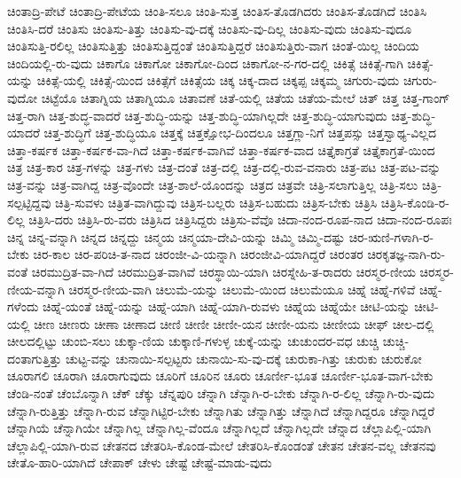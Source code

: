 {ಚಿಂತಾದ್ರಿ-ಪೇಟೆ
ಚಿಂತಾದ್ರಿ-ಪೇಟೆಯ
ಚಿಂತಿ-ಸಲೂ
ಚಿಂತಿ-ಸುತ್ತ
ಚಿಂತಿಸ-ತೊಡಗಿದರು
ಚಿಂತಿಸ-ತೊಡಗಿದೆ
ಚಿಂತಿಸಿ
ಚಿಂತಿಸಿ-ದರೆ
ಚಿಂತಿಸು
ಚಿಂತಿಸು-ತಿತ್ತು
ಚಿಂತಿಸು-ವು-ದಕ್ಕೆ
ಚಿಂತಿಸು-ವು-ದಿಲ್ಲ
ಚಿಂತಿಸು-ವುದು
ಚಿಂತಿಸು-ವುದೂ
ಚಿಂತಿಸುತ್ತಿ-ರಲಿಲ್ಲ
ಚಿಂತಿಸುತ್ತಿತ್ತು
ಚಿಂತಿಸುತ್ತಿದ್ದಂತೆ
ಚಿಂತಿಸುತ್ತಿದ್ದರೆ
ಚಿಂತಿಸುತ್ತಿರು-ವಾಗ
ಚಿಂತೆ-ಯಿಲ್ಲ
ಚಿಂದಿಯ
ಚಿಂದಿಯಲ್ಲಿ-ರು-ವುದು
ಚಿಕಾಗೊ
ಚಿಕಾಗೋ
ಚಿಕಾಗೋ-ದಿಂದ
ಚಿಕಾಗೋ-ನ-ಗರ-ದಲ್ಲಿ
ಚಿಕಿತ್ಸೆ
ಚಿಕಿತ್ಸೆ-ಗಾಗಿ
ಚಿಕಿತ್ಸೆ-ಯನ್ನು
ಚಿಕಿತ್ಸೆ-ಯಲ್ಲಿ
ಚಿಕಿತ್ಸೆ-ಯಿಂದ
ಚಿಕಿತ್ಸೆಗೆ
ಚಿಕಿತ್ಸೆಯ
ಚಿಕ್ಕ
ಚಿಕ್ಕ-ದಾದ
ಚಿಕ್ಕಪ್ಪ
ಚಿಕ್ಕಮ್ಮ
ಚಿಗುರು-ವುದು
ಚಿಗುರು-ವುದೋ
ಚಿಟ್ಟೆಯೊ
ಚಿತಾಗ್ನಿಯ
ಚಿತಾಗ್ನಿಯೂ
ಚಿತಾವಣೆ
ಚಿತೆ-ಯಲ್ಲಿ
ಚಿತೆಯ
ಚಿತೆಯ-ಮೇಲೆ
ಚಿತ್
ಚಿತ್ತ
ಚಿತ್ತ-ಗಾಂಗ್
ಚಿತ್ತ-ರಾಗಿ
ಚಿತ್ತ-ಶುದ್ಧ-ವಾದರೆ
ಚಿತ್ತ-ಶುದ್ಧಿ-ಯನ್ನು
ಚಿತ್ತ-ಶುದ್ಧಿ-ಯಾಗಿಲ್ಲದೇ
ಚಿತ್ತ-ಶುದ್ಧಿ-ಯಾಗುವುದು
ಚಿತ್ತ-ಶುದ್ಧಿ-ಯಾದರೆ
ಚಿತ್ತ-ಶುದ್ಧಿಗೆ
ಚಿತ್ತ-ಶುದ್ಧಿಯೂ
ಚಿತ್ತಕ್ಕೆ
ಚಿತ್ತಕ್ಷೋಭ-ದಿಂದಲೂ
ಚಿತ್ತಗ್ಲಾ-ನಿಗೆ
ಚಿತ್ತಪಸ್ಸು
ಚಿತ್ತಸ್ವಾಥ್ಯ-ವಿಲ್ಲದ
ಚಿತ್ತಾ-ಕರ್ಷಕ
ಚಿತ್ತಾ-ಕರ್ಷಕ-ವಾ-ಗಿದೆ
ಚಿತ್ತಾ-ಕರ್ಷಕ-ವಾಗಿವೆ
ಚಿತ್ತಾ-ಕರ್ಷಕ-ವಾದ
ಚಿತ್ತೈಕಾಗ್ರತೆ
ಚಿತ್ತೈಕಾಗ್ರತೆ-ಯಿಂದ
ಚಿತ್ರ
ಚಿತ್ರ-ಕಾರ
ಚಿತ್ರ-ಗಳನ್ನು
ಚಿತ್ರ-ಗಳು
ಚಿತ್ರ-ದಂತೆ
ಚಿತ್ರ-ದಲ್ಲಿ
ಚಿತ್ರ-ದಲ್ಲಿ-ರುವ-ವನಾರು
ಚಿತ್ರ-ಪಟ
ಚಿತ್ರ-ಪಟ-ವನ್ನು
ಚಿತ್ರ-ವನ್ನು
ಚಿತ್ರ-ವಾಗಿದ್ದ
ಚಿತ್ರ-ವೊಂದೇ
ಚಿತ್ರ-ಶಾಲೆ-ಯೊಂದನ್ನು
ಚಿತ್ರದ
ಚಿತ್ರವೇ
ಚಿತ್ರಿ-ಸಲಾಗುತ್ತಿಲ್ಲ
ಚಿತ್ರಿ-ಸಲು
ಚಿತ್ರಿ-ಸಲ್ಪಟ್ಟಿದ್ದವು
ಚಿತ್ರಿ-ಸುವಳು
ಚಿತ್ರಿತ-ವಾಗಿದ್ದುವು
ಚಿತ್ರಿಸ-ಬಲ್ಲರು
ಚಿತ್ರಿಸ-ಬಹುದು
ಚಿತ್ರಿಸ-ಬೇಕು
ಚಿತ್ರಿಸಿ
ಚಿತ್ರಿಸಿ-ಕೊಂಡಿ-ರ-ಲಿಲ್ಲ
ಚಿತ್ರಿಸಿ-ದರು
ಚಿತ್ರಿಸಿ-ರು-ವರು
ಚಿತ್ರಿಸಿದ
ಚಿತ್ರಿಸಿದ್ದರು
ಚಿತ್ರಿಸು-ವೆವೊ
ಚಿದಾ-ನಂದ-ರೂಪ-ನಾದ
ಚಿದಾ-ನಂದ-ರೂಪಃ
ಚಿನ್ನ
ಚಿನ್ನ-ವನ್ನಾಗಿ
ಚಿನ್ನದ
ಚಿನ್ನದ್ದು
ಚಿನ್ಮಯ
ಚಿನ್ಮಯಾ-ದೇವಿ-ಯನ್ನು
ಚಿಮ್ಮಿ
ಚಿಮ್ಮಿ-ದಷ್ಟು
ಚಿರ-ಋಣಿ-ಗಳಾಗಿ-ರ-ಬೇಕು
ಚಿರ-ಕಾಲ
ಚಿರ-ಪರಿಚಿ-ತ-ನಾದ
ಚಿರಂಜೀ-ವಿ-ಯನ್ನಾಗಿ
ಚಿರಂಜೀವಿ-ಯಾಗಿದ್ದರೆ
ಚಿರಂತರ
ಚಿರಕೃತಜ್ಞ-ನಾಗಿ-ರು-ವಂತೆ
ಚಿರಮುದ್ರಿತ-ವಾ-ಗಿದೆ
ಚಿರಮುದ್ರಿತ-ವಾಗಿವೆ
ಚಿರಸ್ಥಾಯಿ-ಯಾಗಿ
ಚಿರಸ್ನೇಹಿ-ತ-ರಾದರು
ಚಿರಸ್ಮರ-ಣೀಯ
ಚಿರಸ್ಮರ-ಣೀಯ-ವನ್ನಾಗಿ
ಚಿರಸ್ಮರ-ಣೀಯ-ವಾಗಿ
ಚಿಲುಮೆ-ಯನ್ನು
ಚಿಲುಮೆ-ಯಿಂದ
ಚಿಲುಮೆಯೂ
ಚಿಹ್ನೆ
ಚಿಹ್ನೆ-ಗಳಿವೆ
ಚಿಹ್ನೆ-ಗಳೆಂದು
ಚಿಹ್ನೆ-ಯಂತೆ
ಚಿಹ್ನೆ-ಯನ್ನು
ಚಿಹ್ನೆ-ಯಾಗಿ
ಚಿಹ್ನೆ-ಯಾಗಿ-ರುವಳು
ಚಿಹ್ನೆಯ
ಚಿಹ್ನೆಯೇ
ಚೀಟಿ-ಯನ್ನು
ಚೀಟಿ-ಯಲ್ಲಿ
ಚೀಣ
ಚೀಣರು
ಚೀಣಾ
ಚೀಣಾದ
ಚೀಣಿ
ಚೀಣೀ
ಚೀಣೀ-ಯನ
ಚೀಣೀ-ಯನು
ಚೀಣೀಯ
ಚೀಫ್
ಚೀಲ-ದಲ್ಲಿ
ಚೀಲದಲ್ಲಿಟ್ಟು
ಚುಂಬಿ-ಸಲು
ಚುಕ್ಕಾ-ಣಿಯ
ಚುಕ್ಕಾಣಿ-ಗಳುಳ್ಳ
ಚುಕ್ಕೆ-ಯನ್ನು
ಚುಚುಂದರ-ವಧ
ಚುಚ್ಚಿ
ಚುಚ್ಚಿ-ದಂತಾಗುತ್ತಿತ್ತು
ಚುಟ್ಟ-ವನ್ನು
ಚುನಾಯಿ-ಸಲ್ಪಟ್ಟರು
ಚುನಾಯಿ-ಸು-ವು-ದಕ್ಕೆ
ಚುರುಕಾ-ಗಿತ್ತು
ಚುರುಕು
ಚುರುಕೋ
ಚೂರಾಗಲಿ
ಚೂರಾಗಿ
ಚೂರಾಗುವುದು
ಚೂರಿಗೆ
ಚೂರಿನ
ಚೂರು
ಚೂರ್ಣೀ-ಭೂತ
ಚೂರ್ಣೀ-ಭೂತ-ವಾಗ-ಬೇಕು
ಚೆಂಡಿ-ನಂತೆ
ಚೆಂಬೊನ್ನಾಗಿ
ಚೆಕ್
ಚೆಕ್ಕು
ಚೆನ್ನಪುರಿ
ಚೆನ್ನಾಗಿ
ಚೆನ್ನಾಗಿ-ರ-ಬೇಕು
ಚೆನ್ನಾಗಿ-ರ-ಲಿಲ್ಲ
ಚೆನ್ನಾಗಿ-ರು-ವುದು
ಚೆನ್ನಾಗಿ-ರುತ್ತಿತ್ತು
ಚೆನ್ನಾಗಿ-ರುವ
ಚೆನ್ನಾಗಿಟ್ಟಿರ-ಬೇಕು
ಚೆನ್ನಾಗಿತು
ಚೆನ್ನಾಗಿತ್ತು
ಚೆನ್ನಾಗಿದೆ
ಚೆನ್ನಾಗಿದ್ದರೂ
ಚೆನ್ನಾಗಿದ್ದರೆ
ಚೆನ್ನಾಗಿಯೆ
ಚೆನ್ನಾಗಿಯೇ
ಚೆನ್ನಾಗಿಲ್ಲ
ಚೆನ್ನಾಗಿಲ್ಲ-ವೆಂದೂ
ಚೆನ್ನಾಗಿಲ್ಲದೆ
ಚೆನ್ನಾಗಿಲ್ಲದೇ
ಚೆನ್ನಾದ
ಚೆಲ್ಲಾಪಿಲ್ಲಿ-ಯಾಗಿ
ಚೆಲ್ಲಾಪಿಲ್ಲಿ-ಯಾಗಿ-ರುವ
ಚೇತನದ
ಚೇತರಿಸಿ-ಕೊಂಡ-ಮೇಲೆ
ಚೇತರಿಸಿ-ಕೊಂಡಂತೆ
ಚೇತನ
ಚೇತನ-ವಲ್ಲ
ಚೇತನವು
ಚೇತೊ-ಹಾರಿ-ಯಾಗಿದೆ
ಚೇಪಾಕ್
ಚೇಳು
ಚೇಷ್ಟೆ
ಚೇಷ್ಟೆ-ಮಾಡು-ವುದು
}
